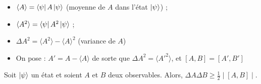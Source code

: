 \documentclass[../notesdecours]{subfiles}
\begin{document}
\begin{itemize}[label = \textbullet]
    \item $\langle A \rangle = \bra{\psi} A \ket{\psi}$ (moyenne de $A$ dans l'état $\ket{\psi}$) ; 
    \item $\langle A^2 \rangle = \bra{\psi} A^2 \ket{\psi}$ ; 
    \item $\Delta A^2 = \langle A^2 \rangle - \langle A \rangle^2$ (variance de $A$)
    \item On pose : $A' = A - \langle A \rangle$ de sorte que $\Delta A^2 = \langle A'^2 \rangle$, et $[A,B] = [A', B']$ \\
\end{itemize}

\begin{theorem} \label{th:chap6-theoreme_incertitude}
    Soit $\ket{\psi}$ un état et soient $A$ et $B$ deux observables.     Alors, $ \Delta A \Delta B \geq \frac{1}{2} \mid [A,B] \mid$. \\
\end{theorem}
\end{document}
